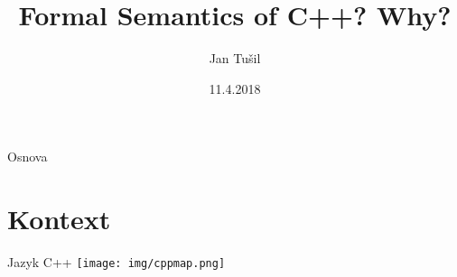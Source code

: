 \documentclass[11pt]{beamer}
\author{Jan Tušil}
\title{Formal Semantics of C++? Why?}
\institute{FI MU}
\date{11.4.2018}
\begin{document}







\begin{frame}
\titlepage
\end{frame}

\begin{frame}{Osnova}
\tableofcontents
\end{frame}


\section{Kontext}

\begin{frame}{Jazyk C++}
\texttt{[image: img/cppmap.png]}
\end{frame}
\end{document}
